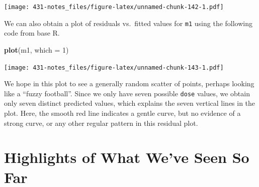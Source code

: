 \documentclass[
]{book}
\newenvironment{Shaded}{\begin{snugshade}}{\end{snugshade}}
\newcommand{\DataTypeTok}[1]{\textcolor[rgb]{0.13,0.29,0.53}{#1}}
\newcommand{\DecValTok}[1]{\textcolor[rgb]{0.00,0.00,0.81}{#1}}
\newcommand{\KeywordTok}[1]{\textcolor[rgb]{0.13,0.29,0.53}{\textbf{#1}}}
\newcommand{\NormalTok}[1]{#1}
\newcommand{\OperatorTok}[1]{\textcolor[rgb]{0.81,0.36,0.00}{\textbf{#1}}}
\newcommand{\StringTok}[1]{\textcolor[rgb]{0.31,0.60,0.02}{#1}}
\begin{document}
\begin{Shaded}
\end{Shaded}

\texttt{[image: 431-notes\_files/figure-latex/unnamed-chunk-142-1.pdf]}

We can also obtain a plot of residuals vs.~fitted values for \texttt{m1} using the following code from base R.

\begin{Shaded}
\begin{Highlighting}[]
\KeywordTok{plot}\NormalTok{(m1, }\DataTypeTok{which =} \DecValTok{1}\NormalTok{)}
\end{Highlighting}
\end{Shaded}

\texttt{[image: 431-notes\_files/figure-latex/unnamed-chunk-143-1.pdf]}

We hope in this plot to see a generally random scatter of points, perhaps looking like a ``fuzzy football''. Since we only have seven possible \texttt{dose} values, we obtain only seven distinct predicted values, which explains the seven vertical lines in the plot. Here, the smooth red line indicates a gentle curve, but no evidence of a strong curve, or any other regular pattern in this residual plot.

\hypertarget{highlights-of-what-weve-seen-so-far}{%
\chapter{Highlights of What We've Seen So Far}\label{highlights-of-what-weve-seen-so-far}}
\end{document}
